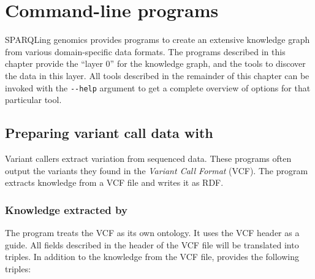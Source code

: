 \chapter{Command-line programs}
\label{chap:command-line}

  SPARQLing genomics provides programs to create an extensive knowledge graph
  from various domain-specific data formats.  The programs described in this
  chapter provide the ``layer 0'' for the knowledge graph, and the tools to
  discover the data in this layer.   All tools described in the remainder of
  this chapter can be invoked with the \texttt{-{}-help} argument to get a
  complete overview of options for that particular tool.

\section{Preparing variant call data with }
\label{sec:vcf2rdf}

  Variant callers extract variation from sequenced data.  These programs
  often output the variants they found in the \emph{Variant Call Format}
  (VCF).  The  program extracts knowledge from a VCF file
  and writes it as RDF.

\subsection{Knowledge extracted by }

  The program treats the VCF as its own ontology.  It uses the VCF header as
  a guide.  All fields described in the header of the VCF file will be
  translated into triples.  In addition to the knowledge from the VCF file,
   provides the following triples:

